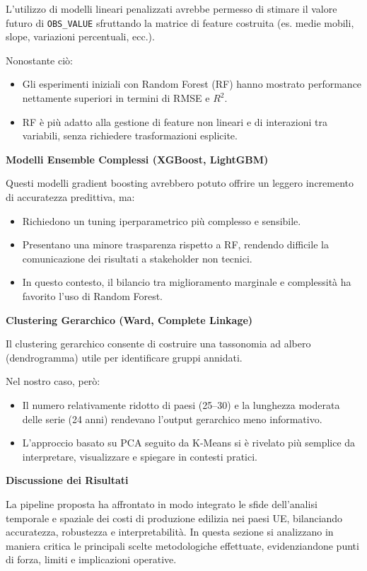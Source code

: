 \documentclass[conference]{IEEEtran}
\begin{document}
\begin{itemize}
{L’utilizzo di modelli lineari penalizzati avrebbe permesso di stimare il valore futuro di \texttt{OBS\_VALUE} sfruttando la matrice di feature costruita (es. medie mobili, slope, variazioni percentuali, ecc.).

Nonostante ciò:
\begin{itemize}
    \item Gli esperimenti iniziali con Random Forest (RF) hanno mostrato performance nettamente superiori in termini di RMSE e $R^2$.
    \item RF è più adatto alla gestione di feature non lineari e di interazioni tra variabili, senza richiedere trasformazioni esplicite.
\end{itemize}

\noindent\textbf{Modelli Ensemble Complessi (XGBoost, LightGBM)}

Questi modelli gradient boosting avrebbero potuto offrire un leggero incremento di accuratezza predittiva, ma:

\begin{itemize}
    \item Richiedono un tuning iperparametrico più complesso e sensibile.
    \item Presentano una minore trasparenza rispetto a RF, rendendo difficile la comunicazione dei risultati a stakeholder non tecnici.
    \item In questo contesto, il bilancio tra miglioramento marginale e complessità ha favorito l’uso di Random Forest.
\end{itemize}

\noindent\textbf{Clustering Gerarchico (Ward, Complete Linkage)}

Il clustering gerarchico consente di costruire una tassonomia ad albero (dendrogramma) utile per identificare gruppi annidati.

Nel nostro caso, però:
\begin{itemize}
    \item Il numero relativamente ridotto di paesi (25–30) e la lunghezza moderata delle serie (24 anni) rendevano l’output gerarchico meno informativo.
    \item L’approccio basato su PCA seguito da K-Means si è rivelato più semplice da interpretare, visualizzare e spiegare in contesti pratici.
\end{itemize}


\noindent\textbf{Discussione dei Risultati}


La pipeline proposta ha affrontato in modo integrato le sfide dell’analisi temporale e spaziale dei costi di produzione edilizia nei paesi UE, bilanciando accuratezza, robustezza e interpretabilità. In questa sezione si analizzano in maniera critica le principali scelte metodologiche effettuate, evidenziandone punti di forza, limiti e implicazioni operative.

}
\end{itemize}
\end{document}
